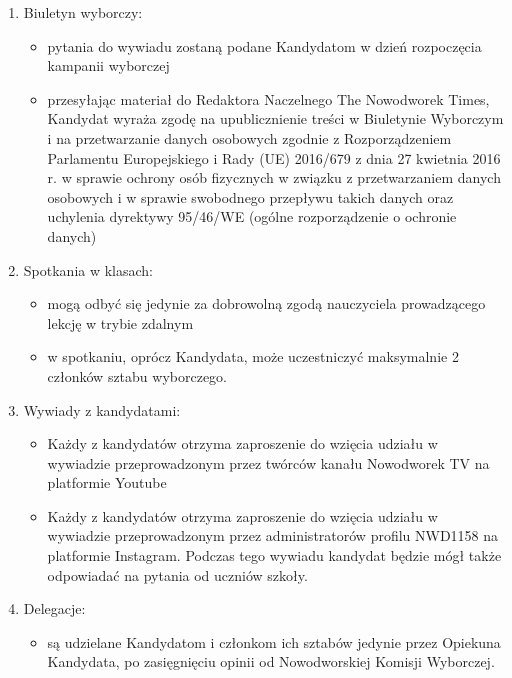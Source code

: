 \documentclass[12pt]{article}
\begin{document}
\begin{enumerate}
    
        \item Biuletyn wyborczy:
            \begin{itemize}
                \item pytania do wywiadu zostaną podane Kandydatom w dzień rozpoczęcia kampanii wyborczej
                \item przesyłając materiał do Redaktora Naczelnego The Nowodworek Times, Kandydat wyraża zgodę na upublicznienie treści w Biuletynie Wyborczym i na przetwarzanie danych osobowych zgodnie z Rozporządzeniem Parlamentu Europejskiego i Rady (UE) 2016/679 z dnia 27 kwietnia 2016 r. w sprawie ochrony osób fizycznych w związku z przetwarzaniem danych osobowych i w sprawie swobodnego przepływu takich danych oraz uchylenia dyrektywy 95/46/WE (ogólne rozporządzenie o ochronie danych)
            \end{itemize}
        \item Spotkania w klasach:
            \begin{itemize}
                \item mogą odbyć się jedynie za dobrowolną zgodą nauczyciela prowadzącego lekcję w trybie zdalnym
                
                \item w spotkaniu, oprócz Kandydata, może uczestniczyć maksymalnie 2 członków sztabu wyborczego.
            \end{itemize}
        \item Wywiady z kandydatami:
            \begin{itemize}
                \item Każdy z kandydatów otrzyma zaproszenie do wzięcia udziału w wywiadzie przeprowadzonym przez twórców kanału Nowodworek TV na platformie Youtube
                \item Każdy z kandydatów otrzyma zaproszenie do wzięcia udziału w wywiadzie przeprowadzonym przez administratorów profilu NWD1158 na platformie Instagram. Podczas tego wywiadu kandydat będzie mógł także odpowiadać na pytania od uczniów szkoły.
            \end{itemize}
    
        \item Delegacje:
            \begin{itemize}
                \item są udzielane Kandydatom i członkom ich sztabów jedynie przez Opiekuna Kandydata, po zasięgnięciu opinii od Nowodworskiej Komisji Wyborczej.
            \end{itemize}
    \end{enumerate}
\end{document}
